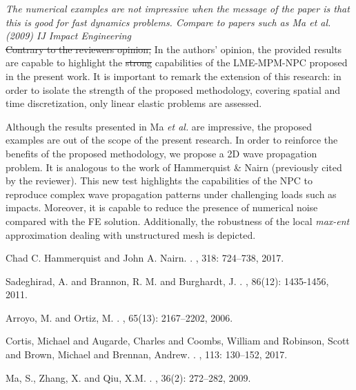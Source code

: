 \documentclass[12pt]{article}
\begin{document}
 \textit{The numerical examples are not impressive when the message of the paper is that this is good for fast dynamics problems. Compare to papers such as Ma et al. (2009) IJ Impact Engineering}\\

\sout{Contrary to the reviewer\textquotesingle s opinion,} In the authors' opinion, the provided results are capable to highlight the \sout{strong} capabilities of the \acrshort{LME-}MPM-NPC proposed in the present work. It is important to remark the extension of this research: in order to isolate the strength of the proposed methodology, covering spatial and time discretization, only linear elastic problems are assessed. 

Although the results presented in Ma {\it et al.} \cite{MA2009272} are impressive, the proposed examples are out of the scope of the present research. In order to reinforce the benefits of the proposed methodology, we propose a 2D wave propagation problem. It is analogous to the work of Hammerquist \& Nairn \cite{HAMMERQUIST2017724} (previously cited by the reviewer). This new test highlights the capabilities of the NPC to reproduce complex wave propagation patterns under challenging loads such as impacts. Moreover, it is capable to reduce the presence of numerical noise compared with the FE solution. Additionally, the robustness of the local \textit{max-ent} approximation dealing with unstructured mesh is depicted.


\begin{thebibliography}{10}

Chad C. Hammerquist and John A. Nairn.
.
,  318: 724--738, 2017.

Sadeghirad, A. and Brannon, R. M. and Burghardt, J.
.
, 86(12): 1435-1456, 2011.

Arroyo, M. and Ortiz, M.
.
,  65(13): 2167--2202, 2006.

Cortis, Michael and Augarde, Charles and Coombs, William and Robinson, Scott and Brown, Michael and Brennan, Andrew.
.
, 113: 130--152, 2017.

Ma, S., Zhang, X.  and  Qiu, X.M.
.
, 36(2): 272--282, 2009.

\end{thebibliography}
\end{document}

